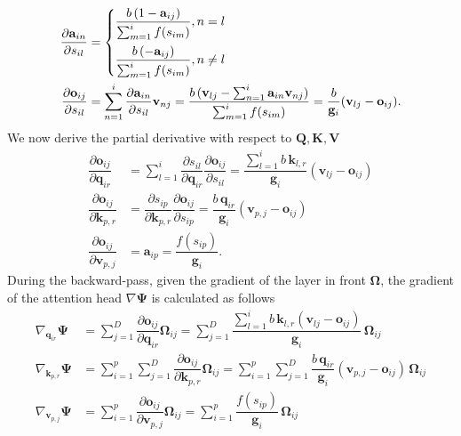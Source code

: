 \begin{align}
    \dfrac{\partial\mathbf{a}_{in}}{\partial s_{il}} &= \begin{cases}\dfrac{b\,(1-\mathbf{a}_{ij})}{\sum_{m=1}^{i}f(s_{im})}, n = l\vspace{5pt
}\\\dfrac{b\,(-\mathbf{a}_{ij})}{\sum_{m=1}^{i}f(s_{im})}, n\neq l\end{cases}\\
\dfrac{\partial\mathbf{o}_{ij}}{\partial s_{il}} &= \sum_{n=1}^{i}\dfrac{\partial\mathbf{a}_{in}}{\partial s_{il}}\mathbf{v}_{nj} = \dfrac{b\,(\mathbf{v}_{lj} - \sum_{n=1}^{i}\mathbf{a}_{in}\mathbf{v}_{nj})}{\sum_{m=1}^{i}f(s_{im})} = \dfrac{b}{\mathbf{g}_{i}}(\mathbf{v}_{lj} - \mathbf{o}_{ij}).\label{bound}
\end{align}
We now derive the partial derivative with respect to $\mathbf{Q},\mathbf{K},\mathbf{V}$
\begin{align}
    \dfrac{\partial\mathbf{o}_{ij}}{\partial \mathbf{q}_{ir}} &= 
    \sum_{l=1}^{i} \dfrac{\partial s_{il}}{\partial \mathbf{q}_{ir}}\dfrac{\partial\mathbf{o}_{ij}}{\partial s_{il}} = \dfrac{\sum_{l=1}^{i}b\,\mathbf{k}_{l,r}}{\mathbf{g}_{i}}(\mathbf{v}_{lj} - \mathbf{o}_{ij})\\
    \dfrac{\partial\mathbf{o}_{ij}}{\partial \mathbf{k}_{p,r}} &= 
     \dfrac{\partial s_{ip}}{\partial \mathbf{k}_{p,r}}\dfrac{\partial\mathbf{o}_{ij}}{\partial s_{ip}} = \dfrac{b\,\mathbf{q}_{ir}}{\mathbf{g}_{i}}(\mathbf{v}_{p,j} - \mathbf{o}_{ij})\\
    \dfrac{\partial\mathbf{o}_{ij}}{\partial \mathbf{v}_{p,j}} &= \mathbf{a}_{ip} = \dfrac{f(s_{ip})}{\mathbf{g}_{i}}.
\end{align}
During the backward-pass, given the gradient of the layer in front $\mathbf{\Omega}$, the gradient of the attention head $\nabla\mathbf{\Psi}$ is calculated as follows
\begin{align}
    \nabla_{\mathbf{q}_{ir}}\mathbf{\Psi} &= \sum_{j=1}^{D}\dfrac{\partial\mathbf{o}_{ij}}{\partial \mathbf{q}_{ir}} \mathbf{\Omega}_{ij} = \sum_{j=1}^{D}\dfrac{\sum_{l=1}^{i}b\,\mathbf{k}_{l,r}(\mathbf{v}_{lj} - \mathbf{o}_{ij})}{\mathbf{g}_{i}} \,\mathbf{\Omega}_{ij}\\ 
    \nabla_{\mathbf{k}_{p,r}}\mathbf{\Psi} &=  \sum_{i=1}^{p}\sum_{j=1}^{D}\dfrac{\partial\mathbf{o}_{ij}}{\partial \mathbf{k}_{p,r}} \mathbf{\Omega}_{ij} = \sum_{i=1}^{p}\sum_{j=1}^{D}\dfrac{b\,\mathbf{q}_{ir}}{\mathbf{g}_{i}}(\mathbf{v}_{p,j} - \mathbf{o}_{ij})\,\mathbf{\Omega}_{ij}\\
    \nabla_{\mathbf{v}_{p,j}}\mathbf{\Psi} &= \sum_{i=1}^{p} \dfrac{\partial\mathbf{o}_{ij}}{\partial \mathbf{v}_{p,j}} \mathbf{\Omega}_{ij} = \sum_{i=1}^{p}\dfrac{f(s_{ip})}{\mathbf{g}_{i}}\,\mathbf{\Omega}_{ij}
\end{align}
